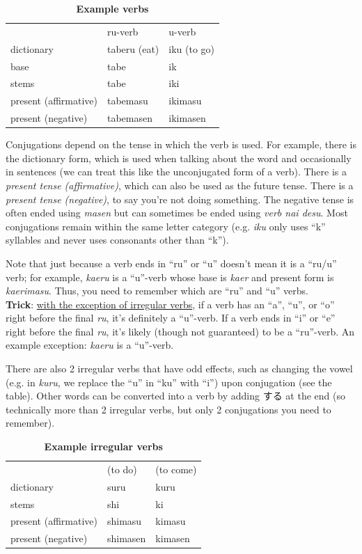 \documentclass{proc}
\newcommand{\tab}[3][|r|l|]{
    {   %
        \begin{table}[H] %
        \caption*{\textbf{#2}}
        \vspace{-0.3cm} %
        \centering
        \begin{tabular}{#1}%
        \hline
        #3
        \end{tabular}
        \end{table}
    }
}
\newcommand{\q}[1]{``#1''}
\begin{document}
{\tab[|l|ll|]{Example verbs}{
\multicolumn{1}{|c|}{} &    ru-verb    &   u-verb  \\
\cline{2-3}
dictionary              &   taberu (eat)   &   iku (to go)  \\
\cline{2-3}
base                    &   tabe        &   ik   \\
stems                   &   tabe        &   iki  \\
present (affirmative)   &   tabemasu    &   ikimasu     \\
present (negative)      &   tabemasen   &   ikimasen  \\\hline
}

\par
Conjugations depend on the tense in which the verb is used. For example, there is the dictionary form, which is used when talking about the word and occasionally in sentences (we can treat this like the unconjugated form of a verb). There is a \textit{present tense (affirmative)}, which can also be used as the future tense. There is a \textit{present tense (negative)}, to say you're not doing something. The negative tense is often ended using \textit{masen} but can sometimes be ended using \textit{verb nai desu}. Most conjugations remain within the same letter category (e.g. \textit{iku} only uses \q{k} syllables and never uses consonants other than \q{k}).
\par
Note that just because a verb ends in \q{ru} or \q{u} doesn't mean it is a \q{ru/u} verb; for example, \textit{kaeru} is a \q{u}-verb whose base is \textit{kaer} and present form is \textit{kaerimasu}. Thus, you need to remember which are \q{ru} and \q{u} verbs.
\\
\textbf{Trick}: \underline{with the exception of irregular verbs}, if a verb has an \q{a}, \q{u}, or \q{o} right before the final \textit{ru}, it's definitely a \q{u}-verb. If a verb ends in \q{i} or \q{e} right before the final \textit{ru}, it's likely (though not guaranteed) to be a \q{ru}-verb. An example exception: \textit{kaeru} is a \q{u}-verb.
\par
There are also 2 irregular verbs that have odd effects, such as changing the vowel (e.g. in \textit{kuru}, we replace the \q{u} in \q{ku} with \q{i}) upon conjugation (see the table). Other words can be converted into a verb by adding する at the end (so technically more than 2 irregular verbs, but only 2 conjugations you need to remember).

\tab[|l|ll|]{Example irregular verbs}{
\multicolumn{1}{|c}{}   &    (to do)    &   (to come)  \\
\cline{2-3}
dictionary              &   suru        &   kuru   \\
\cline{2-3}
stems                   &   shi         &   ki  \\
present (affirmative)   &   shimasu     &   kimasu     \\
present (negative)      &   shimasen    &   kimasen  \\\hline
}



}
\end{document}
